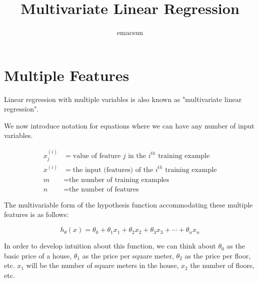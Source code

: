 \documentclass[10pt,a4paper,UTF8]{article}
\author{emacsun}
\date{}
\title{Multivariate Linear Regression}
\begin{document}
\maketitle
\tableofcontents
{}
\section{Multiple Features}
\label{sec:org6bb2104}


Linear regression with multiple variables is also known as "multivariate linear regression".

We now introduce notation for equations where we can have any number of input variables.

\begin{align*}x_j^{(i)} &= \text{value of feature } j \text{ in the }i^{th}\text{ training example} \\ x^{(i)}& = \text{the input (features) of the }i^{th}\text{ training example} \\ m &= \text{the number of training examples} \\ n &= \text{the number of features} \end{align*}

The multivariable form of the hypothesis function accommodating these multiple features is as follows:

\begin{equation}
\label{eq:1}
h_\theta (x) = \theta_0 + \theta_1 x_1 + \theta_2 x_2 + \theta_3 x_3 + \cdots + \theta_n x_n
\end{equation}

In order to develop intuition about this function, we can think about \(\theta_{0}\) as the basic price of a house, \(\theta_{1}\) as the price per square meter, \(\theta_{2}\) as the price per floor, etc. \(x_{1}\) will be the number of square meters in the house, \(x_{2}\) the number of floors, etc.
\end{document}
